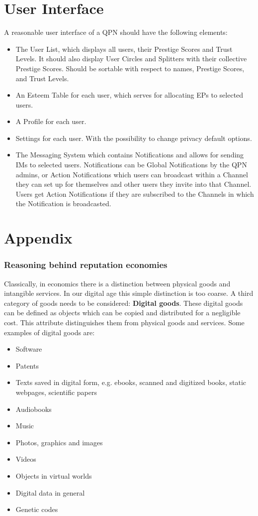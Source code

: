 \documentclass[a4paper,12pt]{scrartcl}
\newcounter{example}
\begin{document}
\part{User Interface}

A reasonable user interface of a QPN should have the following elements:
\begin{itemize}
 \item The User List, which displays all users, their Prestige Scores and Trust Levels. It should also display User Circles and Splitters with their collective Prestige Scores. Should be sortable with respect to names, Prestige Scores, and Trust Levels.
 \item An Esteem Table for each user, which serves for allocating EPs to selected users.
 \item A Profile for each user.
 \item Settings for each user. With the possibility to change privacy default options.
 \item The Messaging System which contains Notifications and allows for sending IMs to selected users. Notifications can be Global Notifications by the QPN admins, or Action Notifications which users can broadcast within a Channel they can set up for themselves and other users they invite into that Channel. Users get Action Notifications if they are subscribed to the Channels in which the Notification is broadcasted.
\end{itemize}

\appendix

\part{Appendix}

\section{Reasoning behind reputation economies}
Classically, in economics there is a distinction between physical goods and intangible services. In our digital age this simple distinction is too coarse. A third category of goods needs to be considered: \textbf{Digital goods}. These digital goods can be defined as objects which can be copied and distributed for a negligible cost. This attribute distinguishes them from physical goods and services. Some examples of digital goods are:
\begin{itemize}
 \item Software
 \item Patents
 \item Texts saved in digital form, e.g. ebooks, scanned and digitized books, static webpages, scientific papers
 \item Audiobooks
 \item Music
 \item Photos, graphics and images
 \item Videos
 \item Objects in virtual worlds
 \item Digital data in general
 \item Genetic codes
\end{itemize}
\end{document}
